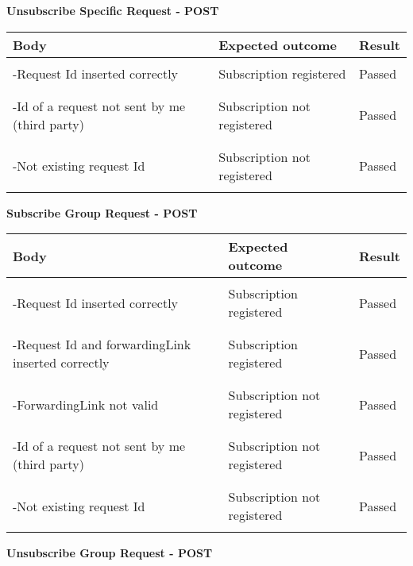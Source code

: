 \textbf{Unsubscribe Specific Request - POST}
\begin{center}
	\begin{tabular}{|p{}|p{}|p{}|}
		\hline
		Body & Expected outcome & Result \\
		\hline
		&&\\
		-Request Id inserted correctly&Subscription registered&Passed\\
		&&\\
		\hline
		&&\\
		-Id of a request not sent by me (third party)&Subscription not registered&Passed\\
		&&\\
		\hline
		&&\\
		-Not existing request Id &Subscription not registered&Passed\\
		&&\\
		\hline
	\end{tabular}
\end{center}
\textbf{Subscribe Group Request - POST}
\begin{center}
	\begin{tabular}{|p{}|p{}|p{}|}
		\hline
		Body & Expected outcome & Result \\
		\hline
		&&\\
		-Request Id inserted correctly&Subscription registered&Passed\\
		&&\\
		\hline
		&&\\
		-Request Id and forwardingLink inserted correctly&Subscription registered&Passed\\
		&&\\
		\hline
		&&\\
		-ForwardingLink not valid &Subscription not registered&Passed\\
		&&\\
		\hline
		&&\\
		-Id of a request not sent by me (third party)&Subscription not registered&Passed\\
		&&\\
		\hline
		&&\\
		-Not existing request Id &Subscription not registered&Passed\\
		&&\\
		\hline
	\end{tabular}
\end{center}
\textbf{Unsubscribe Group Request - POST}
